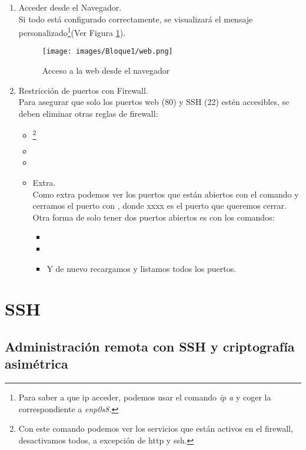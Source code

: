\begin{enumerate}
  \item Acceder desde el Navegador.\\
  Si todo está configurado correctamente, se visualizará el mensaje personalizado\footnote{Para saber a que ip acceder, podemos usar el comando \textit{ip a} y coger la correspondiente a \textit{enp0s8.}}(Ver Figura \ref{web}).
  \begin{figure}[H]
    \centering
      \texttt{[image: images/Bloque1/web.png]}
      \caption{Acceso a la web desde el navegador}
      \label{web}
  \end{figure}
  \item Restricción de puertos con Firewall.\\
  Para asegurar que solo los puertos web (80) y SSH (22) estén accesibles, se deben eliminar
otras reglas de firewall:
\begin{itemize}
  \item {}\footnote{Con este comando podemos ver los servicios que están activos en el firewall, desactivamos todos, a excepción de http y ssh.}
  \item {}
  \item {}
  \item Extra.\\
  Como extra podemos ver los puertos que están abiertos con el comando  y cerramos el puerto con , donde xxxx es el puerto que queremos cerrar. Otra forma de solo tener dos puertos abiertos es con los comandos:
  \begin{itemize}
    \item {}
    \item {}
    \item Y de nuevo recargamos y listamos todos los puertos.
  \end{itemize}
\end{itemize}
\end{enumerate}

\newpage
\section{SSH}

\subsection{Administración remota con SSH y criptografía asimétrica}

